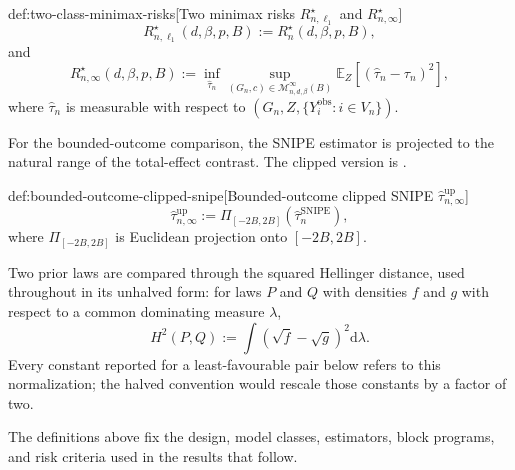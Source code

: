 \begin{definitionv}{def:two-class-minimax-risks}[Two minimax risks $R_{n,\ell_1}^{\star}$ and $R_{n,\infty}^{\star}$]
\[
R_{n,\ell_1}^{\star}(d,\beta,p,B)
:=
R_n^\star(d,\beta,p,B),
\]
and
\[
R_{n,\infty}^{\star}(d,\beta,p,B)
:=
\inf_{\widehat\tau_n}
\sup_{(G_n,c)\in\mathcal M_{n,d,\beta}^{\infty}(B)}
\mathbb E_Z\!\left[
\left(\widehat\tau_n-\tau_n\right)^2
\right],
\]
where \(\widehat\tau_n\) is measurable with respect to \((G_n,Z,\{Y_i^{\mathrm{obs}}:i\in V_n\})\).
\end{definitionv}

For the bounded-outcome comparison, the SNIPE estimator is projected to the natural range of the total-effect contrast. The clipped version is .

\begin{definitionv}{def:bounded-outcome-clipped-snipe}[Bounded-outcome clipped SNIPE $\widehat\tau_{n,\infty}^{\mathrm{up}}$]
\[
\widehat\tau_{n,\infty}^{\mathrm{up}}
:=
\Pi_{[-2B,2B]}\!\left(\widehat\tau_n^{\mathrm{SNIPE}}\right),
\]
where \(\Pi_{[-2B,2B]}\) is Euclidean projection onto \([-2B,2B]\).
\end{definitionv}

Two prior laws are compared through the squared Hellinger distance, used throughout in its unhalved form: for laws \(P\) and \(Q\) with densities \(f\) and \(g\) with respect to a common dominating measure \(\lambda\),
\[
H^2(P,Q):=\int\left(\sqrt{f}-\sqrt{g}\right)^2\mathrm{d}\lambda .
\]
Every constant reported for a least-favourable pair below refers to this normalization; the halved convention would rescale those constants by a factor of two.

The definitions above fix the design, model classes, estimators, block programs, and risk criteria used in the results that follow.
